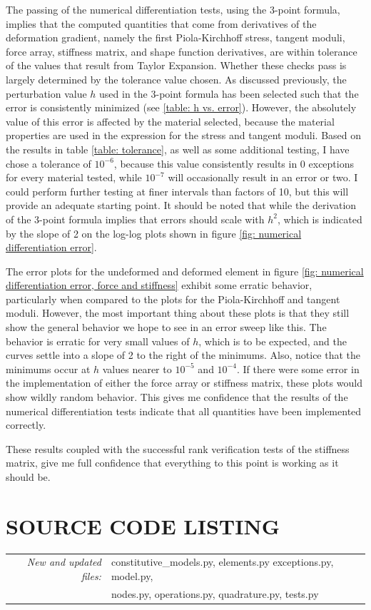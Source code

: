 \documentclass[]{spie}  %
\begin{document}
The passing of the numerical differentiation tests, using the 3-point formula, implies that the computed quantities that come from derivatives of the deformation gradient, namely the first Piola-Kirchhoff stress, tangent moduli, force array, stiffness matrix, and shape function derivatives, are within tolerance of the values that result from Taylor Expansion. Whether these checks pass is largely determined by the tolerance value chosen. As discussed previously, the perturbation value $h$ used in the 3-point formula has been selected such that the error is consistently minimized (see \ref{table: h vs. error}). However, the absolutely value of this error is affected by the material selected, because the material properties are used in the expression for the stress and tangent moduli. Based on the results in table \ref{table: tolerance}, as well as some additional testing, I have chose a tolerance of $10^{-6}$, because this value consistently results in 0 exceptions for every material tested, while $10^{-7}$ will occasionally result in an error or two. I could perform further testing at finer intervals than factors of 10, but this will provide an adequate starting point. It should be noted that while the derivation of the 3-point formula implies that errors should scale with $h^2$, which is indicated by the slope of 2 on the log-log plots shown in figure \ref{fig: numerical differentiation error}. 

The error plots for the undeformed and deformed element in figure \ref{fig: numerical differentiation error, force and stiffness} exhibit some erratic behavior, particularly when compared to the plots for the Piola-Kirchhoff and tangent moduli. However, the most important thing about these plots is that they still show the general behavior we hope to see in an error sweep like this. The behavior is erratic for very small values of $h$, which is to be expected, and the curves settle into a slope of 2 to the right of the minimums. Also, notice that the minimums occur at $h$ values nearer to $10^{-5}$ and $10^{-4}$. If there were some error in the implementation of either the force array or stiffness matrix, these plots would show wildly random behavior. This gives me confidence that the results of the numerical differentiation tests indicate that all quantities have been implemented correctly. 

These results coupled with the successful rank verification tests of the stiffness matrix, give me full confidence that everything to this point is working as it should be. 


\section{SOURCE CODE LISTING}

\begin{tabular}{ r l }
\textit{New and updated files:} & constitutive\_models.py, elements.py exceptions.py, model.py,  \\ 
								& nodes.py, operations.py, quadrature.py, tests.py 
					  
\end{tabular}
\end{document}
